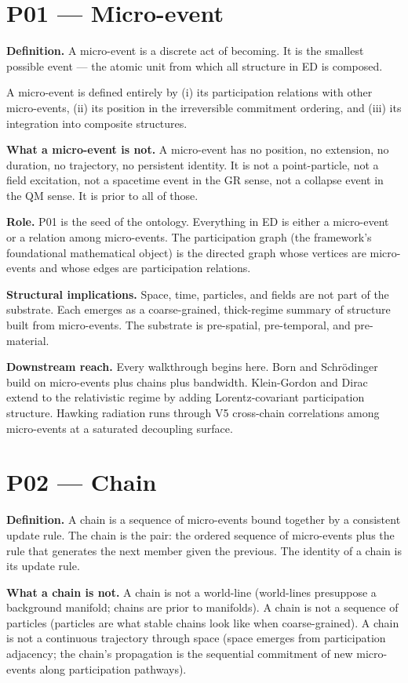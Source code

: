 \documentclass[11pt,a4paper]{article}
\begin{document}
\section{P01 --- Micro-event}

\textbf{Definition.} A micro-event is a discrete act of becoming. It is the smallest possible event --- the atomic unit from which all structure in ED is composed.

A micro-event is defined entirely by (i) its participation relations with other micro-events, (ii) its position in the irreversible commitment ordering, and (iii) its integration into composite structures.

\textbf{What a micro-event is not.} A micro-event has no position, no extension, no duration, no trajectory, no persistent identity. It is not a point-particle, not a field excitation, not a spacetime event in the GR sense, not a collapse event in the QM sense. It is prior to all of those.

\textbf{Role.} P01 is the seed of the ontology. Everything in ED is either a micro-event or a relation among micro-events. The participation graph (the framework's foundational mathematical object) is the directed graph whose vertices are micro-events and whose edges are participation relations.

\textbf{Structural implications.} Space, time, particles, and fields are not part of the substrate. Each emerges as a coarse-grained, thick-regime summary of structure built from micro-events. The substrate is pre-spatial, pre-temporal, and pre-material.

\textbf{Downstream reach.} Every walkthrough begins here. Born and Schr\"odinger build on micro-events plus chains plus bandwidth. Klein-Gordon and Dirac extend to the relativistic regime by adding Lorentz-covariant participation structure. Hawking radiation runs through V5 cross-chain correlations among micro-events at a saturated decoupling surface.

\section{P02 --- Chain}

\textbf{Definition.} A chain is a sequence of micro-events bound together by a consistent update rule. The chain is the pair: the ordered sequence of micro-events plus the rule that generates the next member given the previous. The identity of a chain is its update rule.

\textbf{What a chain is not.} A chain is not a world-line (world-lines presuppose a background manifold; chains are prior to manifolds). A chain is not a sequence of particles (particles are what stable chains look like when coarse-grained). A chain is not a continuous trajectory through space (space emerges from participation adjacency; the chain's propagation is the sequential commitment of new micro-events along participation pathways).
\end{document}
